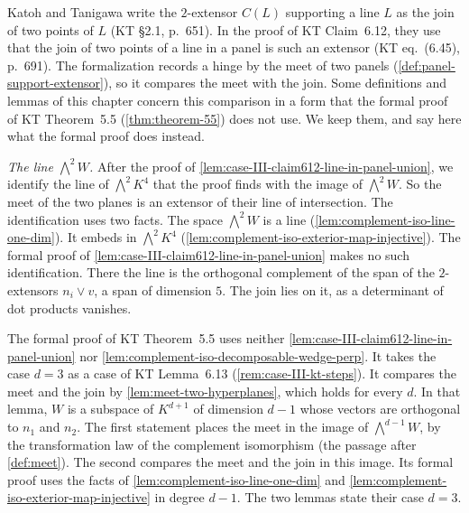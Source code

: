 \begin{remark}
  \label{rem:meet-kt-steps}
  Katoh and Tanigawa write the $2$-extensor $C(L)$ supporting a line $L$
  as the join of two points of $L$ (KT \S2.1, p.~651). In the proof of
  KT Claim~6.12, they use that the join of two points of a line in a
  panel is such an extensor (KT eq.~(6.45), p.~691). The formalization
  records a hinge by the meet of two panels
  (\cref{def:panel-support-extensor}), so it compares the meet with the
  join. Some definitions and lemmas of this chapter concern this
  comparison in a form that the formal proof of KT Theorem~5.5
  (\cref{thm:theorem-55}) does not use. We keep them, and say here what
  the formal proof does instead.

  \emph{The line $\bigwedge^2 W$.} After the proof of
  \cref{lem:case-III-claim612-line-in-panel-union}, we identify the line
  of $\bigwedge^2 K^4$ that the proof finds with the image of
  $\bigwedge^2 W$. So the meet of the two planes is an extensor of their
  line of intersection. The identification uses two facts. The space
  $\bigwedge^2 W$ is a line (\cref{lem:complement-iso-line-one-dim}). It
  embeds in $\bigwedge^2 K^4$
  (\cref{lem:complement-iso-exterior-map-injective}). The formal proof
  of \cref{lem:case-III-claim612-line-in-panel-union} makes no such
  identification. There the line is the orthogonal complement of the
  span of the $2$-extensors $n_i \vee v$, a span of dimension $5$. The
  join lies on it, as a determinant of dot products vanishes.

  The formal proof of KT Theorem~5.5 uses neither
  \cref{lem:case-III-claim612-line-in-panel-union} nor
  \cref{lem:complement-iso-decomposable-wedge-perp}. It takes the case
  $d = 3$ as a case of KT Lemma~6.13 (\cref{rem:case-III-kt-steps}). It
  compares the meet and the join by \cref{lem:meet-two-hyperplanes},
  which holds for every $d$. In that lemma, $W$ is a subspace of
  $K^{d+1}$ of dimension $d - 1$ whose vectors are orthogonal to $n_1$
  and $n_2$. The first statement places the meet in the image of
  $\bigwedge^{d-1} W$, by the transformation law of the complement
  isomorphism (the passage after \cref{def:meet}). The second compares
  the meet and the join in this image. Its formal proof uses the facts
  of \cref{lem:complement-iso-line-one-dim} and
  \cref{lem:complement-iso-exterior-map-injective} in degree $d - 1$.
  The two lemmas state their case $d = 3$.


\end{remark}
